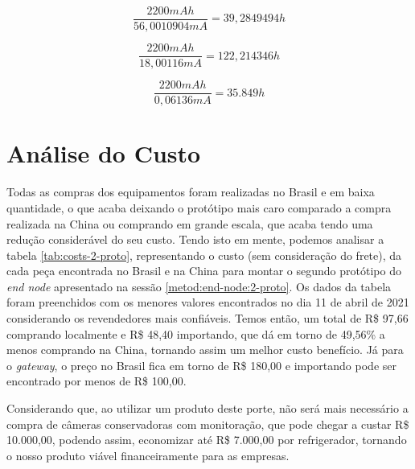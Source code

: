 \begin{equation}
  \frac{2200 mAh}{56,0010904 mA} = 39,2849494 h
  \label{equation:p1-hours} 
\end{equation}

\begin{equation}
  \frac{2200 mAh}{18,00116 mA} = 122,214346 h
  \label{equation:p2-hours} 
\end{equation}

\begin{equation}
  \frac{2200 mAh}{0,06136 mA} = 35.849 h
  \label{equation:p3-hours} 
\end{equation}

\section{Análise do Custo}
\label{result:custo}
Todas as compras dos equipamentos foram realizadas no Brasil e em baixa quantidade, o que acaba deixando o protótipo mais caro comparado a compra realizada na China ou comprando em grande escala, que acaba tendo uma redução considerável do seu custo. Tendo isto em mente, podemos analisar a tabela \ref{tab:costs-2-proto}, representando o custo (sem consideração do frete), da cada peça encontrada no Brasil e na China para montar o segundo protótipo do \textit{end node} apresentado na sessão \ref{metod:end-node:2-proto}. Os dados da tabela foram preenchidos com os menores valores encontrados no dia 11 de abril de 2021 considerando os revendedores mais confiáveis. Temos então, um total de R\$ 97,66 comprando localmente e R\$ 48,40 importando, que dá em torno de 49,56\% a menos comprando na China, tornando assim um melhor custo benefício.	Já para o \textit{gateway}, o preço no Brasil fica em torno de R\$  180,00 e importando pode ser encontrado por menos de R\$  100,00.

Considerando que, ao utilizar um produto deste porte, não será mais necessário a compra de câmeras conservadoras com monitoração,  que pode chegar a custar R\$ 10.000,00, podendo assim, economizar até R\$ 7.000,00 por refrigerador, tornando o nosso produto viável financeiramente para as empresas.

